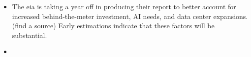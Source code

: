 \begin{itemize}
    \item The \gls{eia} is taking a year off in producing their report to better account for increased behind-the-meter investment, AI needs, and data center expansions. (find a source) Early estimations indicate that these factors will be substantial.
    \item
\end{itemize}